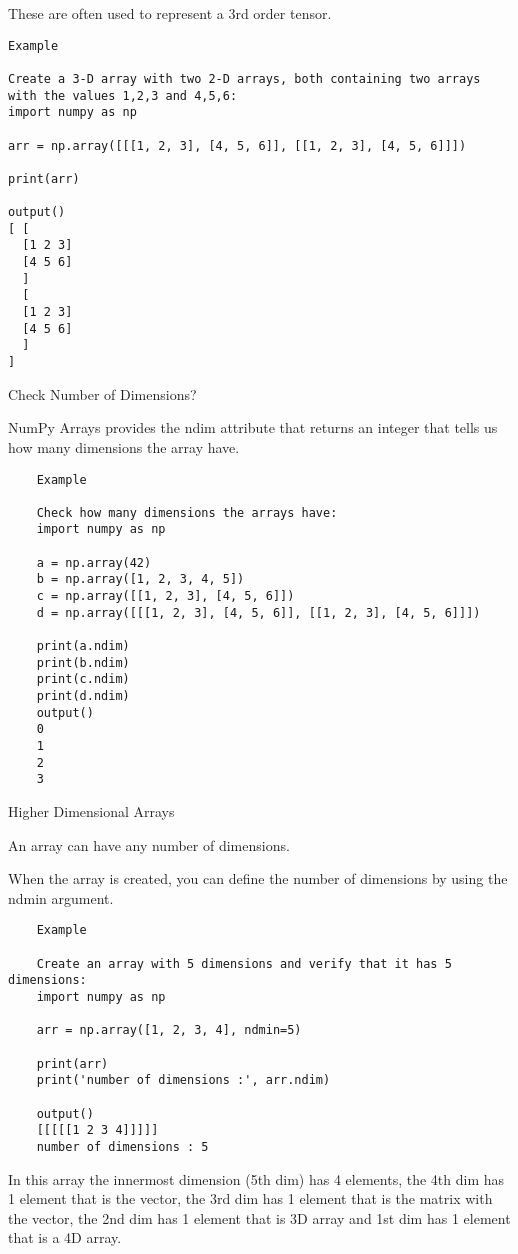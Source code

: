 These are often used to represent a 3rd order tensor.

\begin{verbatim}
Example

Create a 3-D array with two 2-D arrays, both containing two arrays with the values 1,2,3 and 4,5,6:
import numpy as np

arr = np.array([[[1, 2, 3], [4, 5, 6]], [[1, 2, 3], [4, 5, 6]]])

print(arr) 

output()
[ [
  [1 2 3]
  [4 5 6]
  ]
  [
  [1 2 3]
  [4 5 6]
  ]
]
\end{verbatim}


Check Number of Dimensions?

NumPy Arrays provides the ndim attribute that returns an integer that tells us how many dimensions the array have.


\begin{verbatim}
	Example
	
	Check how many dimensions the arrays have:
	import numpy as np
	
	a = np.array(42)
	b = np.array([1, 2, 3, 4, 5])
	c = np.array([[1, 2, 3], [4, 5, 6]])
	d = np.array([[[1, 2, 3], [4, 5, 6]], [[1, 2, 3], [4, 5, 6]]])
	
	print(a.ndim)
	print(b.ndim)
	print(c.ndim)
	print(d.ndim) 
	output()
	0
	1
	2
	3
\end{verbatim}

Higher Dimensional Arrays

An array can have any number of dimensions.

When the array is created, you can define the number of dimensions by using the ndmin argument.

\begin{verbatim}
	Example
	
	Create an array with 5 dimensions and verify that it has 5 dimensions:
	import numpy as np
	
	arr = np.array([1, 2, 3, 4], ndmin=5)
	
	print(arr)
	print('number of dimensions :', arr.ndim) 
	
	output()
	[[[[[1 2 3 4]]]]]
	number of dimensions : 5
\end{verbatim}
In this array the innermost dimension (5th dim) has 4 elements, the 4th dim has 1 element that is the vector, the 3rd dim has 1 element that is the matrix with the vector, the 2nd dim has 1 element that is 3D array and 1st dim has 1 element that is a 4D array.

